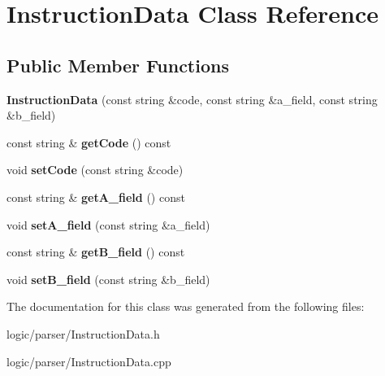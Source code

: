 \hypertarget{classInstructionData}{}\section{Instruction\+Data Class Reference}
\label{classInstructionData}
\subsection*{Public Member Functions}
\begin{DoxyCompactItemize}
\item 
\mbox{\label{classInstructionData_aca4d7e3e5ee2d317daa11eecb9e3b80b}} 
{\bfseries Instruction\+Data} (const string \&code, const string \&a\+\_\+field, const string \&b\+\_\+field)
\item 
\mbox{\label{classInstructionData_a24df36f2815df009ab28f415a03e2df5}} 
const string \& {\bfseries get\+Code} () const
\item 
\mbox{\label{classInstructionData_a2cfad65ce30b28785d7c0a01822677ec}} 
void {\bfseries set\+Code} (const string \&code)
\item 
\mbox{\label{classInstructionData_aee6171141ba4998760bad4db6c101c47}} 
const string \& {\bfseries get\+A\+\_\+field} () const
\item 
\mbox{\label{classInstructionData_ab71eb04ab2e46502c3f981443e12ed39}} 
void {\bfseries set\+A\+\_\+field} (const string \&a\+\_\+field)
\item 
\mbox{\label{classInstructionData_a569cf018c8f6b90b2c91ac03f0522820}} 
const string \& {\bfseries get\+B\+\_\+field} () const
\item 
\mbox{\label{classInstructionData_ab941a4d2566cc2fdfe7265ea9e4f5f93}} 
void {\bfseries set\+B\+\_\+field} (const string \&b\+\_\+field)
\end{DoxyCompactItemize}


The documentation for this class was generated from the following files\+:\begin{DoxyCompactItemize}
\item 
logic/parser/Instruction\+Data.\+h\item 
logic/parser/Instruction\+Data.\+cpp\end{DoxyCompactItemize}

